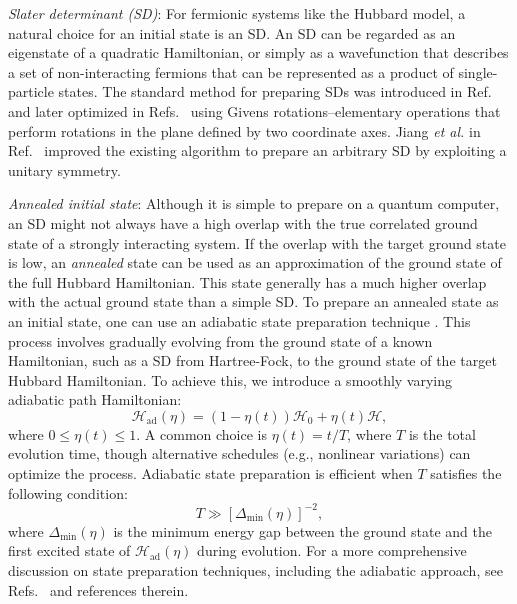 \documentclass[twocolumn,superscriptaddress,amsmath,amssymb,showpacs,floatfix,preprintnumbers]{revtex4-1}
\newcommand{\mc}{\mathcal}
\newcommand{\mr}{\mathrm}
\begin{document}
\textit{Slater determinant (SD)}:
For fermionic systems like the Hubbard model, a natural choice for an initial state is an SD.
%
An SD can be regarded as an eigenstate of a quadratic Hamiltonian, or simply as 
a wavefunction that describes a set of non-interacting fermions that can be represented as a
product of single-particle states.
%
The standard method for preparing SDs was introduced in Ref.~\cite{Ortiz2001} and later optimized 
in Refs.~\cite{Wecker2015s,Kivlichan2018} using Givens rotations--elementary operations that perform
rotations in the plane defined by two coordinate axes.
%
Jiang \textit{et al.} in Ref.~\cite{Jiang2018} improved the existing algorithm to prepare an arbitrary 
SD by exploiting a unitary symmetry.

\textit{Annealed initial state}:
Although it is simple to prepare on a quantum computer, an SD might not always have a high overlap 
with the true correlated ground state of a strongly interacting system.
%
If the overlap with the target ground state is low, an \textit{annealed} state can be used as an
approximation of the ground state of the full Hubbard Hamiltonian.
%
This state generally has a much higher overlap with the actual ground state than a simple SD.
%
To prepare an annealed state as an initial state, one can use an adiabatic state preparation technique
\cite{Guzik2005,Farhi2001}. 
%
This process involves gradually evolving from the ground state of a known Hamiltonian, such as a 
SD from Hartree-Fock, to the ground state of the target Hubbard Hamiltonian.
%
To achieve this, we introduce a smoothly varying adiabatic path Hamiltonian:
\begin{equation}
	\mc H_\mr{ad}(\eta) = (1 - \eta(t)) \mc H_0 + \eta(t) \mc H, 
\end{equation}
where $0 \leq \eta(t) \leq 1$.
%
A common choice is $\eta(t)=t/T$, where $T$ is the total evolution time, though alternative schedules 
(e.g., nonlinear variations) can optimize the process.
%
Adiabatic state preparation is efficient when $T$ satisfies the following condition:
\begin{equation} \label{eq:T_evol}
	T \gg [\Delta_\mr{min} (\eta)] ^{-2},
\end{equation}
where $\Delta_\mr{min} (\eta)$ is the minimum energy gap between the ground state and the first excited 
state of $\mc H_\mr{ad}(\eta)$ during evolution.
%
For a more comprehensive discussion on state preparation techniques, including the adiabatic 
approach, see Refs.~\cite{Wecker2015s,Whitfield2011} and references therein.
\end{document}
